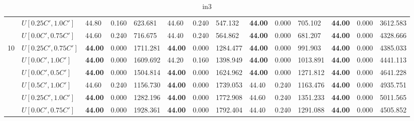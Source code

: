 \begin{table}[h]
{\begin{tabular}{|l|l||l|l|l||l|l|l||l|l|l||l|l|l|}
       & $U[0.25C',1.0C']$ & 44.80 & 0.160 & 623.681 & 44.60 & 0.240 & 547.132 			& \textbf{44.00} & 0.000 & 705.102 & \textbf{44.00} & 0.000 & 3612.583\\
       & $U[0.0C',0.75C']$ & 44.60 & 0.240 & 716.675 & 44.40 & 0.240 & 564.862 			& \textbf{44.00} & 0.000 & 681.207 & \textbf{44.00} & 0.000 & 4328.666\\
      \hline\hline
      \multirow{6}{*}{10}
       & $U[0.25C',0.75C']$ & \textbf{44.00} & 0.000 & 1711.281 & \textbf{44.00} & 0.000 & 1284.477 	& \textbf{44.00} & 0.000 & 991.903 & \textbf{44.00} & 0.000 & 4385.033\\
       & $U[0.0C',1.0C']$ & \textbf{44.00} & 0.000 & 1609.692 & 44.20 & 0.160 & 1398.949 				& \textbf{44.00} & 0.000 & 1013.891 & \textbf{44.00} & 0.000 & 4441.113\\
       & $U[0.0C',0.5C']$ & \textbf{44.00} & 0.000 & 1504.814 & \textbf{44.00} & 0.000 & 1624.962	 & \textbf{44.00} & 0.000 & 1271.812 & \textbf{44.00} & 0.000 & 4641.228\\
       & $U[0.5C',1.0C']$ & 44.60 & 0.240 & 1156.730 & \textbf{44.00} & 0.000 & 1739.053 				& 44.40 & 0.240 & 1163.476 & \textbf{44.00} & 0.000 & 4935.751\\
       & $U[0.25C',1.0C']$ & \textbf{44.00} & 0.000 & 1282.196 & \textbf{44.00} & 0.000 & 1772.908  & 44.60 & 0.240 & 1351.233 & \textbf{44.00} & 0.000 & 5011.565\\
       & $U[0.0C',0.75C']$ & \textbf{44.00} & 0.000 & 1928.361 & \textbf{44.00} & 0.000 & 1792.404 & 44.40 & 0.240 & 1291.088 & \textbf{44.00} & 0.000 & 4505.852\\
      \hline
      \end{tabular}
      }
      \caption{in3}
      \label{tab:in3}\end{table}


